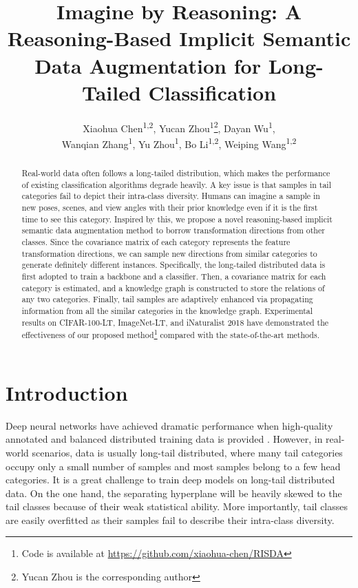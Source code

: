 \documentclass[letterpaper]{article} \usepackage{aaai22}  \usepackage{times}  \usepackage{helvet}  \usepackage{courier}  \usepackage[hyphens]{url}  \usepackage{graphicx} \usepackage{bm}
\title{Imagine by Reasoning: A Reasoning-Based Implicit Semantic Data Augmentation for Long-Tailed Classification}
\author{
Xiaohua Chen\textsuperscript{\rm 1,2}, 
	Yucan Zhou\textsuperscript{\rm 1}\thanks{Yucan Zhou is the corresponding author}, 
	Dayan Wu\textsuperscript{\rm 1}, \\
	Wanqian Zhang\textsuperscript{\rm 1}, 
	Yu Zhou\textsuperscript{\rm 1}, 
	Bo Li\textsuperscript{\rm 1,2}, 
	Weiping Wang\textsuperscript{\rm 1,2}
}
\begin{document}
	\maketitle
	\begin{abstract}
		Real-world data often follows a long-tailed distribution, which makes the performance of existing classification algorithms degrade heavily. A key issue is that samples in tail categories fail to depict their intra-class diversity. Humans can imagine a sample in new poses, scenes, and view angles with their prior knowledge even if it is the first time to see this category. Inspired by this, we propose a novel reasoning-based implicit semantic data augmentation method to borrow transformation directions from other classes. Since the covariance matrix of each category represents the feature transformation directions, we can sample new directions from similar categories to generate definitely different instances. Specifically, the long-tailed distributed data is first adopted to train a backbone and a classifier. Then, a covariance matrix for each category is estimated, and a knowledge graph is constructed to store the relations of any two categories. Finally, tail samples are adaptively enhanced via propagating information from all the similar categories in the knowledge graph. Experimental results on CIFAR-100-LT, ImageNet-LT, and iNaturalist 2018 have demonstrated the effectiveness of our proposed method\footnote{Code is available at \url{https://github.com/xiaohua-chen/RISDA}} compared with the state-of-the-art methods. 
	\end{abstract}
	
	\section{Introduction}
	Deep neural networks have achieved dramatic performance when high-quality annotated and balanced distributed training data is provided \cite{KrizhevskySH12, he2016deep, HuangLMW17}. However, in real-world scenarios, data is usually long-tail distributed, where many tail categories occupy only a small number of samples and most samples belong to a few head categories. It is a great challenge to train deep models on long-tail distributed data. On the one hand, the separating hyperplane will be heavily skewed to the tail classes because of their weak statistical ability. More importantly, tail classes are easily overfitted as their samples fail to describe their intra-class diversity.
	
	
\end{document}
